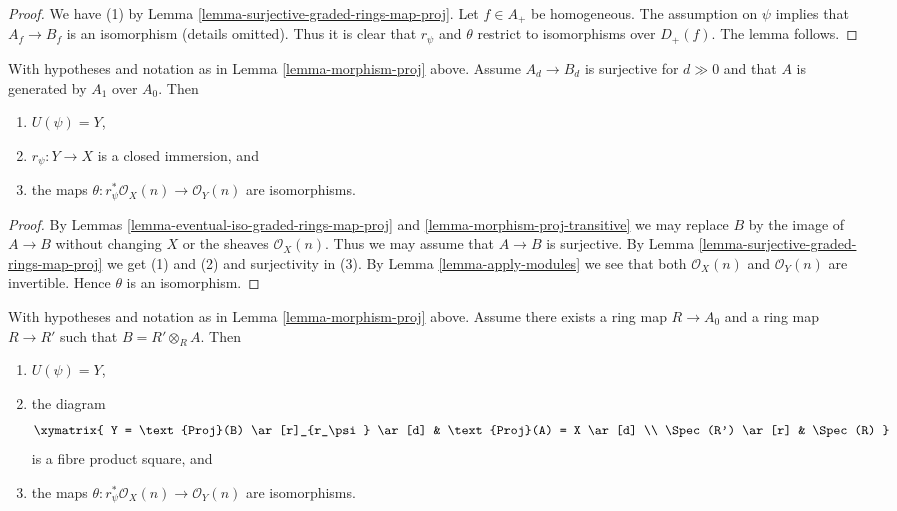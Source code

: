 \begin{proof}
We have (1) by Lemma \ref{lemma-surjective-graded-rings-map-proj}.
Let $f \in A_{+}$ be homogeneous. The assumption on $\psi$ implies that
$A_f \to B_f$ is an isomorphism (details omitted). Thus it is clear that
$r_\psi$ and $\theta$ restrict to isomorphisms over $D_{+}(f)$.
The lemma follows.
\end{proof}

\begin{lemma}
\label{lemma-surjective-graded-rings-generated-degree-1-map-proj}
With hypotheses and notation as in Lemma \ref{lemma-morphism-proj} above.
Assume $A_d \to B_d$ is surjective for $d \gg 0$ and that $A$ is generated
by $A_1$ over $A_0$. Then
\begin{enumerate}
\item $U(\psi) = Y$,
\item $r_\psi : Y \to X$ is a closed immersion, and
\item the maps $\theta : r_\psi^*\mathcal{O}_X(n) \to \mathcal{O}_Y(n)$
are isomorphisms.
\end{enumerate}
\end{lemma}

\begin{proof}
By Lemmas \ref{lemma-eventual-iso-graded-rings-map-proj} and
\ref{lemma-morphism-proj-transitive}
we may replace $B$ by the image of $A \to B$
without changing $X$ or the sheaves $\mathcal{O}_X(n)$.
Thus we may assume that $A \to B$ is surjective. By
Lemma \ref{lemma-surjective-graded-rings-map-proj} we get (1) and (2)
and surjectivity in (3).
By Lemma \ref{lemma-apply-modules} we see that both
$\mathcal{O}_X(n)$ and $\mathcal{O}_Y(n)$
are invertible. Hence $\theta$ is an isomorphism.
\end{proof}

\begin{lemma}
\label{lemma-base-change-map-proj}
\begin{reference}
\cite[II, Proposition 2.8.10]{EGA}
\end{reference}
With hypotheses and notation as in Lemma \ref{lemma-morphism-proj} above.
Assume there exists a ring map $R \to A_0$ and a ring map
$R \to R'$ such that $B = R' \otimes_R A$. Then
\begin{enumerate}
\item $U(\psi) = Y$,
\item the diagram
$$
\xymatrix{
Y = \text{Proj}(B) \ar[r]_{r_\psi} \ar[d] &
\text{Proj}(A) = X \ar[d] \\
\Spec(R') \ar[r] &
\Spec(R)
}
$$
is a fibre product square, and
\item the maps $\theta : r_\psi^*\mathcal{O}_X(n) \to \mathcal{O}_Y(n)$
are isomorphisms.
\end{enumerate}
\end{lemma}

